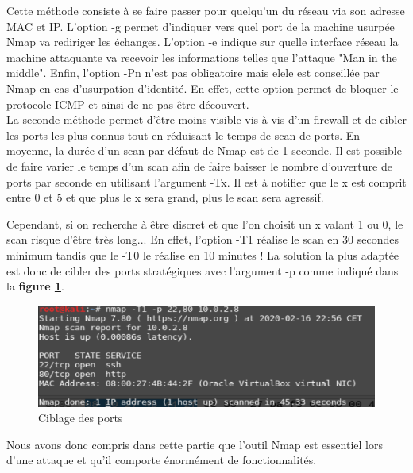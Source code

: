 Cette méthode consiste à se faire passer pour quelqu'un du réseau via son adresse MAC et IP. L'option -g permet d'indiquer vers quel port de la machine usurpée Nmap va rediriger les échanges. L'option -e indique sur quelle interface réseau la machine attaquante va recevoir les informations telles que l'attaque "Man in the middle". Enfin, l'option -Pn n'est pas obligatoire mais elele est conseillée par Nmap en cas d'usurpation d'identité. En effet, cette option permet de bloquer le protocole ICMP et ainsi de ne pas être découvert.\\
La seconde méthode permet d'être moins visible vis à vis d'un firewall et de cibler les ports les plus connus tout en réduisant le temps de scan de ports. En moyenne, la durée d'un scan par défaut de Nmap est de 1 seconde. Il est possible de faire varier le temps d'un scan afin de faire baisser le nombre d'ouverture de ports par seconde en utilisant l'argument -Tx. Il est à notifier que le x est comprit entre 0 et 5 et que plus le x sera grand, plus le scan sera agressif. \\

\vspace{0.1cm}

Cependant, si on recherche à être discret et que l'on choisit un x valant 1 ou 0, le scan risque d'être très long... En effet, l'option -T1 réalise le scan en 30 secondes minimum tandis que le -T0 le réalise en 10 minutes ! La solution la plus adaptée est donc de cibler des ports stratégiques avec l'argument -p comme indiqué dans la \textbf{figure \ref{fig:port}}.\\



\begin{figure}[]
  \centering
  \setlength\figureheight{7cm}
  \setlength\figurewidth{9cm}
  \includegraphics[width=1\textwidth]{oui/images/nmap/t1.PNG}
  \caption{Ciblage des ports}
  \label{fig:port}
\end{figure}

Nous avons donc compris dans cette partie que l'outil Nmap est essentiel lors d'une attaque et qu'il comporte énormément de fonctionnalités.

